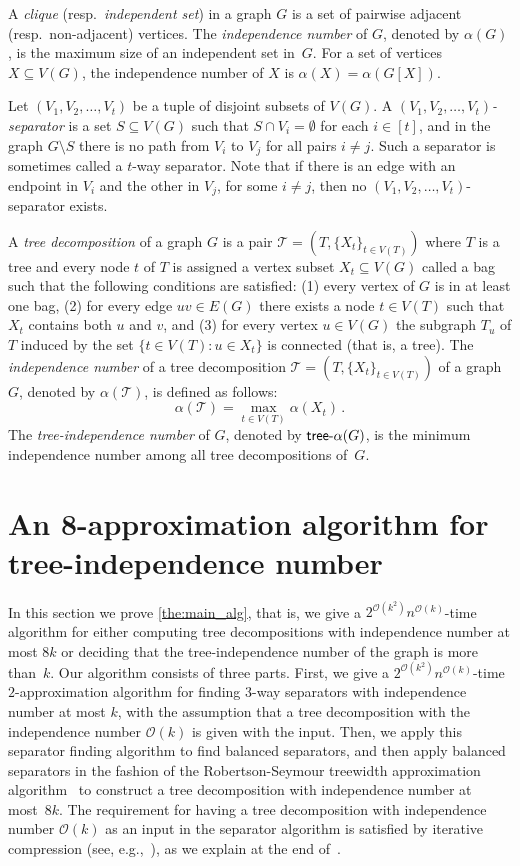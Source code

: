 \documentclass[11pt]{article}
\theoremstyle{definition}
\newcommand{\td}{\mathcal{T}}
\newcommand{\tin}{\mathsf{tree} \textnormal{-} \alpha}
\newcommand{\OO}{\mathcal{O}}
\begin{document}
A \emph{clique} (resp.\ \emph{independent set}) in a graph $G$ is a set of pairwise adjacent (resp.\ non-adjacent) vertices.
The \emph{independence number} of $G$, denoted by $\alpha(G)$, is the maximum size of an independent set in~$G$.
For a set of vertices $X \subseteq V(G)$, the independence number of $X$ is $\alpha(X) = \alpha(G[X])$.

Let $(V_1, V_2, \ldots, V_t)$ be a tuple of disjoint subsets of $V(G)$.
A \emph{$(V_1, V_2, \ldots, V_t)$-separator} is a set $S \subseteq V(G)$ such that $S \cap V_i = \emptyset$ for each $i \in [t]$, and in the graph $G \setminus S$ there is no path from $V_i$ to $V_j$ for all pairs $i \neq j$.
Such a separator is sometimes called a $t$-way separator.
Note that if there is an edge with an endpoint in $V_i$ and the other in $V_j$, for some $i \neq j$, then no $(V_1, V_2, \ldots, V_t)$-separator exists.

A \emph{tree decomposition} of a graph $G$ is a pair $\td = (T, \{X_t\}_{t\in V(T)})$ where $T$ is a tree and every node $t$ of $T$ is assigned a vertex subset $X_t\subseteq V(G)$ called a bag such that the following conditions are satisfied:
(1) every vertex of $G$ is in at least one bag, (2) for every edge $uv\in E(G)$ there exists a node $t\in V(T)$ such that $X_t$ contains both $u$ and $v$, and (3) for every vertex $u\in V(G)$ the subgraph $T_u$ of $T$ induced by the set $\{t\in V(T): u\in X_t\}$ is connected (that is, a tree).
The \emph{independence number} of a tree decomposition $\td = (T, \{X_t\}_{t\in V(T)})$ of a graph $G$, denoted by $\alpha(\td)$, is defined as follows:
\[\alpha(\td) = \max_{t\in V(T)} \alpha(X_t)\,.\]
The \emph{tree-independence number} of $G$, denoted by $\tin(G)$, is the minimum independence number among all tree decompositions of~$G$.


\section{An 8-approximation algorithm for tree-independence number\label{sec:algo}}
In this section we prove \cref{the:main_alg}, that is, we give a $2^{\OO(k^2)}n^{\OO(k)}$-time algorithm for either computing tree decompositions with independence number at most $8k$ or deciding that the tree-independence number of the graph is more than~$k$.
Our algorithm consists of three parts.
First, we give a $2^{\OO(k^2)}n^{\OO(k)}$-time $2$-approximation algorithm for finding 3-way separators with independence number at most $k$, with the assumption that a tree decomposition with the  independence number $\OO(k)$ is given with the input.
Then, we apply this separator finding algorithm to find balanced separators, and then apply balanced separators in the fashion of the Robertson-Seymour treewidth approximation algorithm~\cite{RobertsonS-GMXIII} to construct a tree decomposition with independence number at most~$8k$.
The requirement for having a tree decomposition with independence number $\OO(k)$ as an input in the separator algorithm is satisfied by iterative compression (see, e.g.,~\cite{cygan2015parameterized}), as we explain at the end of~.
\end{document}
